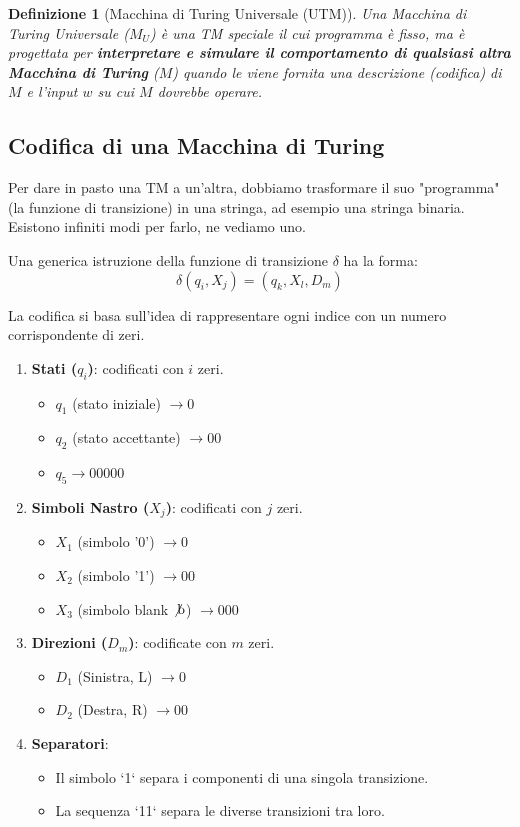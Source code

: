 \documentclass[a4paper]{article}
\newtheorem{definition}{Definizione}
\newcommand{\blankS}{\ensuremath{\not\text{b}}} %
\theoremstyle{remark} %
\begin{document}
\begin{definition}[Macchina di Turing Universale (UTM)]
Una Macchina di Turing Universale ($M_U$) è una TM speciale il cui programma è fisso, ma è progettata per \textbf{interpretare e simulare il comportamento di qualsiasi altra Macchina di Turing} ($M$) quando le viene fornita una descrizione (codifica) di $M$ e l'input $w$ su cui $M$ dovrebbe operare.
\end{definition}

\subsection{Codifica di una Macchina di Turing}

Per dare in pasto una TM a un'altra, dobbiamo trasformare il suo "programma" (la funzione di transizione) in una stringa, ad esempio una stringa binaria. Esistono infiniti modi per farlo, ne vediamo uno.

Una generica istruzione della funzione di transizione $\delta$ ha la forma:
\[ \delta(q_i, X_j) = (q_k, X_l, D_m) \]

La codifica si basa sull'idea di rappresentare ogni indice con un numero corrispondente di zeri.
\begin{enumerate}
    \item \textbf{Stati ($q_i$)}: codificati con $i$ zeri.
    \begin{itemize}
        \item $q_1$ (stato iniziale) $\rightarrow 0$
        \item $q_2$ (stato accettante) $\rightarrow 00$
        \item $q_5 \rightarrow 00000$
    \end{itemize}
    \item \textbf{Simboli Nastro ($X_j$)}: codificati con $j$ zeri.
    \begin{itemize}
        \item $X_1$ (simbolo '0') $\rightarrow 0$
        \item $X_2$ (simbolo '1') $\rightarrow 00$
        \item $X_3$ (simbolo blank $\blankS$) $\rightarrow 000$
    \end{itemize}
    \item \textbf{Direzioni ($D_m$)}: codificate con $m$ zeri.
    \begin{itemize}
        \item $D_1$ (Sinistra, L) $\rightarrow 0$
        \item $D_2$ (Destra, R) $\rightarrow 00$
    \end{itemize}
    \item \textbf{Separatori}:
    \begin{itemize}
        \item Il simbolo `1` separa i componenti di una singola transizione.
        \item La sequenza `11` separa le diverse transizioni tra loro.
    \end{itemize}
\end{enumerate}
\end{document}
